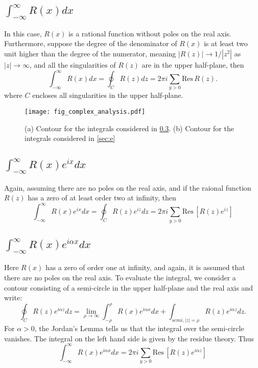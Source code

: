 \documentclass[11pt, letterpaper]{article}
\begin{document}
\subsection{$\displaystyle\int_{-\infty}^{\infty}R(x)dx$}
\label{sec:b}
In this case, $R(x)$ is a rational function without poles on the real axis. Furthermore, suppose the degree of the
denominator of $R(x)$ is at least two unit higher than the degree of the numerator, meaning $|R(z)|\rightarrow 1/|z^2|$
as $|z|\rightarrow\infty$, and all the singularities of $R(z)$ are in the upper half-plane, then 
\begin{equation}
	\int_{-\infty}^\infty R(x)dx = \oint_C R(z)dz = 2\pi i\sum_{y > 0} \mbox{Res}\,R(z).
\end{equation}
where $C$ encloses all singularities in the upper half-plane.

\begin{figure}
\texttt{[image: fig\_complex\_analysis.pdf]}
\caption{(a) Contour for the integrals considered in \ref{sec:d}. (b) Contour for the integrals considered in \ref{sec:e}}
\label{fig:contour}
\end{figure}

\subsection{$\displaystyle\int_{-\infty}^{\infty}R(x)e^{ix}dx$}
\label{sec:c}
Again, assuming there are no poles on the real axis, and if the raional function $R(z)$ has a zero of at least order two
at infinity, then
\begin{equation}
	\int_{-\infty}^{\infty}R(x)e^{ix}dx = \oint_C R(z)e^{iz}dz = 2\pi i\sum_{y>0}\mbox{Res}\,\left[R(z)e^{iz}\right]
\end{equation}

\subsection{$\displaystyle\int_{-\infty}^{\infty}R(x)e^{i\alpha x}dx$}
\label{sec:d}
Here $R(x)$ has a zero of order one at infinity, and again, it is assumed that there are no poles on the real axis.
To evaluate the integral, we consider a contour consisting of a semi-circle in the upper half-plane and the real axis
and write:
\begin{equation}
	\oint_C R(z) e^{i\alpha z}dz = \lim_{\rho\rightarrow\infty}\int_{-\rho}^\rho R(x)e^{i\alpha x}dx +
								   \int_{semi, |z|=\rho}R(z)e^{i\alpha z}dz.
\end{equation}
For $\alpha > 0$, the Jordan's Lemma tells us that the integral over the semi-circle vanishes. The integral on the
left hand side is given by the residue theory. Thus
\begin{equation}
	\int_{-\infty}^{\infty}R(x)e^{i\alpha x}dx = 2\pi i\sum_{y>0}\mbox{Res}\,\left[ R(z)e^{i\alpha z}\right]
\end{equation}
\end{document}
